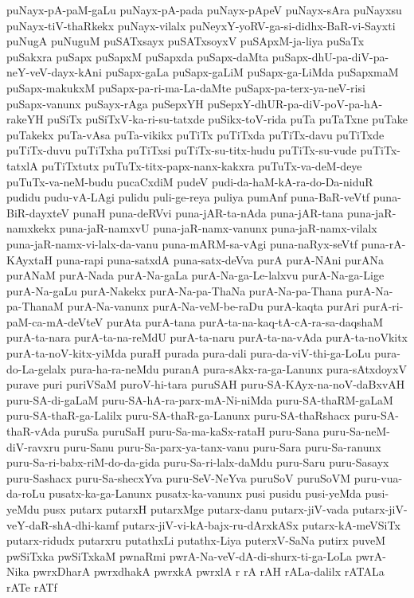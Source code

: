 {puNayx-pA-paM-gaLu
puNayx-pA-pada
puNayx-pApeV
puNayx-sAra
puNayxsu
puNayx-tiV-thaRkekx
puNayx-vilalx
puNeyxY-yoRV-ga-si-didhx-BaR-vi-Sayxti
puNugA
puNuguM
puSATxsayx
puSATxsoyxV
puSApxM-ja-liya
puSaTx
puSakxra
puSapx
puSapxM
puSapxda
puSapx-daMta
puSapx-dhU-pa-diV-pa-neY-veV-dayx-kAni
puSapx-gaLa
puSapx-gaLiM
puSapx-ga-LiMda
puSapxmaM
puSapx-makukxM
puSapx-pa-ri-ma-La-daMte
puSapx-pa-terx-ya-neV-risi
puSapx-vanunx
puSayx-rAga
puSepxYH
puSepxY-dhUR-pa-diV-poV-pa-hA-rakeYH
puSiTx
puSiTxV-ka-ri-su-tatxde
puSikx-toV-rida
puTa
puTaTxne
puTake
puTakekx
puTa-vAsa
puTa-vikikx
puTiTx
puTiTxda
puTiTx-davu
puTiTxde
puTiTx-duvu
puTiTxha
puTiTxsi
puTiTx-su-titx-hudu
puTiTx-su-vude
puTiTx-tatxlA
puTiTxtutx
puTuTx-titx-papx-nanx-kakxra
puTuTx-va-deM-deye
puTuTx-va-neM-budu
pucaCxdiM
pudeV
pudi-da-haM-kA-ra-do-Da-niduR
pudidu
pudu-vA-LAgi
pulidu
puli-ge-reya
puliya
pumAnf
puna-BaR-veVtf
puna-BiR-dayxteV
punaH
puna-deRVvi
puna-jAR-ta-nAda
puna-jAR-tana
puna-jaR-namxkekx
puna-jaR-namxvU
puna-jaR-namx-vanunx
puna-jaR-namx-vilalx
puna-jaR-namx-vi-lalx-da-vanu
puna-mARM-sa-vAgi
puna-naRyx-seVtf
puna-rA-KAyxtaH
puna-rapi
puna-satxdA
puna-satx-deVva
purA
purA-NAni
purANa
purANaM
purA-Nada
purA-Na-gaLa
purA-Na-ga-Le-lalxvu
purA-Na-ga-Lige
purA-Na-gaLu
purA-Nakekx
purA-Na-pa-ThaNa
purA-Na-pa-Thana
purA-Na-pa-ThanaM
purA-Na-vanunx
purA-Na-veM-be-raDu
purA-kaqta
purAri
purA-ri-paM-ca-mA-deVteV
purAta
purA-tana
purA-ta-na-kaq-tA-cA-ra-sa-daqshaM
purA-ta-nara
purA-ta-na-reMdU
purA-ta-naru
purA-ta-na-vAda
purA-ta-noVkitx
purA-ta-noV-kitx-yiMda
puraH
purada
pura-dali
pura-da-viV-thi-ga-LoLu
pura-do-La-gelalx
pura-ha-ra-neMdu
puranA
pura-sAkx-ra-ga-Lanunx
pura-sAtxdoyxV
purave
puri
puriVSaM
puroV-hi-tara
puruSAH
puru-SA-KAyx-na-noV-daBxvAH
puru-SA-di-gaLaM
puru-SA-hA-ra-parx-mA-Ni-niMda
puru-SA-thaRM-gaLaM
puru-SA-thaR-ga-Lalilx
puru-SA-thaR-ga-Lanunx
puru-SA-thaRshacx
puru-SA-thaR-vAda
puruSa
puruSaH
puru-Sa-ma-kaSx-rataH
puru-Sana
puru-Sa-neM-diV-ravxru
puru-Sanu
puru-Sa-parx-ya-tanx-vanu
puru-Sara
puru-Sa-ranunx
puru-Sa-ri-babx-riM-do-da-gida
puru-Sa-ri-lalx-daMdu
puru-Saru
puru-Sasayx
puru-Sashacx
puru-Sa-shecxYva
puru-SeV-NeYva
puruSoV
puruSoVM
puru-vua-da-roLu
pusatx-ka-ga-Lanunx
pusatx-ka-vanunx
pusi
pusidu
pusi-yeMda
pusi-yeMdu
pusx
putarx
putarxH
putarxMge
putarx-danu
putarx-jiV-vada
putarx-jiV-veY-daR-shA-dhi-kamf
putarx-jiV-vi-kA-bajx-ru-dArxkASx
putarx-kA-meVSiTx
putarx-ridudx
putarxru
putathxLi
putathx-Liya
puterxV-SaNa
putirx
puveM
pwSiTxka
pwSiTxkaM
pwnaRmi
pwrA-Na-veV-dA-di-shurx-ti-ga-LoLa
pwrA-Nika
pwrxDharA
pwrxdhakA
pwrxkA
pwrxlA
r
rA
rAH
rALa-dalilx
rATALa
rATe
rATf
}
